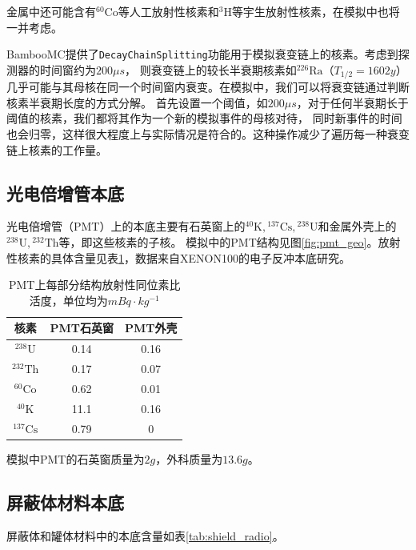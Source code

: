 金属中还可能含有${}^{60}\mathrm{Co}$等人工放射性核素和${}^{3}\mathrm{H}$等宇生放射性核素，在模拟中也将一并考虑。

BambooMC提供了\verb|DecayChainSplitting|功能用于模拟衰变链上的核素。考虑到探测器的时间窗约为$200\mu s$，
则衰变链上的较长半衰期核素如${}^{226}\mathrm{Ra}$（$T_{1/2}=1602y$）几乎可能与其母核在同一个时间窗内衰变。在模拟中，我们可以将衰变链通过判断核素半衰期长度的方式分解。
首先设置一个阈值，如$200\mu s$，对于任何半衰期长于阈值的核素，我们都将其作为一个新的模拟事件的母核对待，
同时新事件的时间也会归零，这样很大程度上与实际情况是符合的。这种操作减少了遍历每一种衰变链上核素的工作量。

\subsection{光电倍增管本底}
\label{sec:pmt_background}

光电倍增管（PMT）上的本底主要有石英窗上的${}^{40}\mathrm{K},{}^{137}\mathrm{Cs},{}^{238}\mathrm{U}$和金属外壳上的${}^{238}\mathrm{U},{}^{232}\mathrm{Th}$等，即这些核素的子核。
模拟中的PMT结构见图\ref{fig:pmt_geo}。放射性核素的具体含量见表\ref{tab:pmt_radio}，数据来自XENON100的电子反冲本底研究\cite{xenon100_collaboration_study_2013}。

\begin{table}
  \centering
  \caption{PMT上每部分结构放射性同位素比活度，单位均为$\si{mBq\cdot kg^{-1}}$}
  \begin{tabular}{ccc}
    \toprule
    核素 & PMT石英窗 & PMT外壳 \\
    \midrule
    ${}^{238}\mathrm{U}$ & 0.14 & 0.16 \\
    ${}^{232}\mathrm{Th}$ & 0.17 & 0.07 \\
    ${}^{60}\mathrm{Co}$ & 0.62 & 0.01 \\
    ${}^{40}\mathrm{K}$ & 11.1 & 0.16 \\
    ${}^{137}\mathrm{Cs}$ & 0.79 & 0 \\
    \bottomrule
  \end{tabular}
  \label{tab:pmt_radio}
\end{table}

模拟中PMT的石英窗质量为$2\si{g}$，外科质量为$13.6\si{g}$。

\subsection{屏蔽体材料本底}

屏蔽体和罐体材料中的本底含量如表\ref{tab:shield_radio}。

